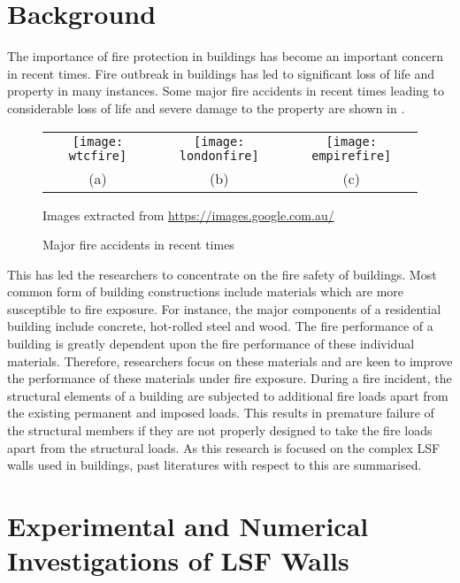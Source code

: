 \section{Background}
The importance of fire protection in buildings has become an important concern in recent times. Fire outbreak in buildings has led to significant loss of life and property in many instances. Some major fire accidents in recent times leading to considerable loss of life and severe damage to the property are shown in . 
\begin{figure}[htbp]
	\centering
		\begin{tabular}{ccc}
			\texttt{[image: wtcfire]} & 
			\texttt{[image: londonfire]} &
			\texttt{[image: empirefire]} \\ 
			(a) & (b) & (c) \\ 
		\end{tabular} 

	\begin{scriptsize}
	Images extracted from \url{https://images.google.com.au/}
	\end{scriptsize}
	
		\caption{Major fire accidents in recent times}
		\label{fig:Major fire accidents}
\end{figure}

This has led the researchers to concentrate on the fire safety of buildings. Most common form of building constructions include materials which are more susceptible to fire exposure. For instance, the major components of a residential building include concrete, hot-rolled steel and wood. The fire performance of a building is greatly dependent upon the fire performance of these individual materials. Therefore, researchers focus on these materials and are keen to improve the performance of these materials under fire exposure. During a fire incident, the structural elements of a building are subjected to additional fire loads apart from the existing permanent and imposed loads. This results in premature failure of the structural members if they are not properly designed to take the fire loads apart from the structural loads. As this research is focused on the complex LSF walls used in buildings, past literatures with respect to this are summarised.

\section{Experimental and Numerical Investigations of LSF Walls}

